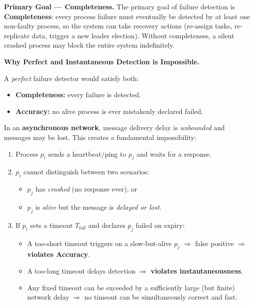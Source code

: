 \documentclass[12pt,a4paper]{article}
\begin{document}
\begin{solbox}
\textbf{Primary Goal — Completeness.}
The primary goal of failure detection is \textbf{Completeness}: every process failure
must eventually be detected by at least one non-faulty process, so the system can
take recovery actions (re-assign tasks, re-replicate data, trigger a new leader
election). Without completeness, a silent crashed process may block the entire system
indefinitely.

\medskip
\textbf{Why Perfect and Instantaneous Detection is Impossible.}

A \emph{perfect} failure detector would satisfy both:
\begin{itemize}
  \item \textbf{Completeness:} every failure is detected.
  \item \textbf{Accuracy:} no alive process is ever mistakenly declared failed.
\end{itemize}

In an \textbf{asynchronous network}, message delivery delay is \emph{unbounded} and
messages may be lost. This creates a fundamental impossibility:

\begin{enumerate}
  \item Process $p_i$ sends a heartbeat/ping to $p_j$ and waits for a response.
  \item $p_i$ cannot distinguish between two scenarios:
        \begin{itemize}
          \item $p_j$ has \emph{crashed} (no response ever), or
          \item $p_j$ is \emph{alive} but the message is \emph{delayed or lost}.
        \end{itemize}
  \item If $p_i$ sets a timeout $T_{\text{fail}}$ and declares $p_j$ failed on expiry:
        \begin{itemize}
          \item A too-short timeout triggers on a slow-but-alive $p_j$
                $\Rightarrow$ false positive $\Rightarrow$ \textbf{violates Accuracy}.
          \item A too-long timeout delays detection $\Rightarrow$ \textbf{violates instantaneousness}.
          \item Any fixed timeout can be exceeded by a sufficiently large (but finite)
                network delay $\Rightarrow$ no timeout can be simultaneously correct and fast.
        \end{itemize}
\end{enumerate}


\end{solbox}
\end{document}
